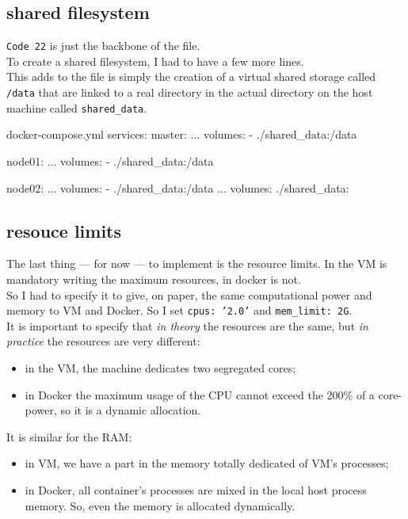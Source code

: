 \subsection{shared filesystem}
\texttt{Code 22} is just the backbone of the file. \\
To create a shared filesystem, I had to have a few more lines. \\
This adds to the file is simply the creation of a virtual shared storage called \texttt{/data} that are linked to a real directory in the actual directory on the host machine called \texttt{shared\_data}. 

\begin{codice}[style=bashstyle]{docker-compose.yml}
services:
  master:
    ...
    volumes:
      - ./shared_data:/data
  
  node01:
    ...
    volumes:
      - ./shared_data:/data
  
  node02:
    ...
    volumes:
      - ./shared_data:/data
...
volumes:
  ./shared_data:
\end{codice}

\subsection{resouce limits}
The last thing --- for now --- to implement is the resource limits. In the VM is mandatory writing the maximum resources, in docker is not. \\
So I had to specify it to give, on paper, the same computational power and memory to VM and Docker. So I set \texttt{cpus: '2.0'} and \texttt{mem\_limit: 2G}. \\
It is important to specify that \textit{in theory} the resources are the same, but \textit{in practice} the resources are very different: 

\begin{itemize}
    \item in the VM, the machine dedicates two segregated cores;
    \item in Docker the maximum usage of the CPU cannot exceed the 200\% of a core-power, so it is a dynamic allocation.
\end{itemize}  

It is similar for the RAM: 

\begin{itemize}
    \item in VM, we have a part in the memory totally dedicated of VM's processes;
    \item in Docker, all container's processes are mixed in the local host process memory. So, even the memory is allocated dynamically.
\end{itemize} 

